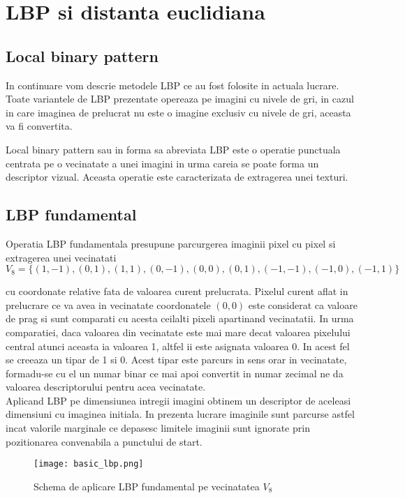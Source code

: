 \section{LBP si distanta euclidiana}

\subsection{Local binary pattern}

\quad In continuare vom descrie metodele LBP ce au fost folosite in
actuala lucrare. Toate variantele de LBP prezentate opereaza pe imagini 
cu nivele de gri, in cazul in care imaginea de prelucrat nu este o imagine
exclusiv cu nivele de gri, aceasta va fi convertita.

\quad Local binary pattern sau in forma sa abreviata LBP este o operatie punctuala centrata  
pe o vecinatate a unei imagini in urma careia se poate forma un descriptor vizual. Aceasta 
operatie este caracterizata de extragerea unei texturi.


\subsection{LBP fundamental}

\quad Operatia LBP fundamentala presupune parcurgerea imaginii pixel cu pixel si extragerea 
unei vecinatati 
\[
V_8 = \{ (1,-1), (0,1), (1,1), (0,-1), (0,0), (0,1),(-1,-1), (-1,0), (-1,1) \}	
\]

cu coordonate relative fata de valoarea curent prelucrata. Pixelul curent aflat in prelucrare ce va avea in vecinatate coordonatele 
$(0,0)$ este considerat ca valoare de prag si sunt comparati cu acesta
ceilalti pixeli apartinand vecinatatii. In urma comparatiei, daca valoarea din vecinatate este mai mare decat valoarea pixelului central 
atunci aceasta ia valoarea 1, altfel ii este asignata valoarea 0. In
acest fel se creeaza un tipar de 1 si 0. Acest tipar este parcurs in sens orar in vecinatate, formadu-se cu el un numar binar ce mai apoi convertit in numar zecimal ne da valoarea descriptorului pentru acea 
vecinatate. \\
\null \quad Aplicand LBP pe dimensiunea intregii imagini obtinem un descriptor
de aceleasi dimensiuni cu imaginea initiala. In prezenta lucrare 
imaginile sunt parcurse astfel incat valorile marginale ce depasesc
limitele imaginii sunt ignorate prin pozitionarea convenabila a 
punctului de start. \\

\begin{figure}[H]
	\texttt{[image: basic\_lbp.png]}
	\centering
	\caption{Schema de aplicare LBP fundamental pe vecinatatea $V_8$}
\end{figure}



